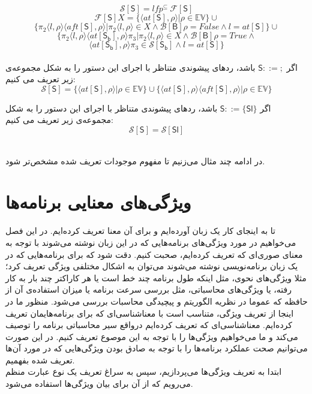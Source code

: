 \begin{defn}
$$\mathcal{S} [\mathsf{S}] = lfp^{\subseteq}\: \mathcal{F[\mathsf{S}]}      $$ $$\mathcal{F} [\mathsf{S}] X= \{ \langle at[\mathsf{S}] , \rho \rangle | \rho \in \mathbb{EV}       \} \cup $$
$$  \{ \pi_2 \langle l ,\rho \rangle \langle aft[\mathsf{S}],\rho \rangle |  \pi_2 \langle l ,\rho \rangle \in X \wedge \mathcal{B}[\mathsf{B}]\rho=False \wedge l= at[\mathsf{S}]   \} \cup      $$
$$  \{ \pi_2 \langle l ,\rho \rangle \langle at[\mathsf{S_b}],\rho \rangle \pi_3 |  \pi_2 \langle l ,\rho \rangle \in X \wedge \mathcal{B}[\mathsf{B}]\rho=True \wedge$$$$  \langle at[\mathsf{S_b}],\rho \rangle \pi_3 \in  \mathcal{S} [\mathsf{S_b}]   \wedge   l= at[\mathsf{S}]  \}  $$\\

اگر $         \mathsf{S} ::=;  $ باشد، ردهای پیشوندی متناظر با اجرای این دستور را به شکل مجموعه‌ی زیر تعریف می کنیم:
$$\mathcal{S} [\mathsf{S}] = \{ \langle at[\mathsf{S}] , \rho \rangle | \rho \in \mathbb{EV}       \} \cup     \{ \langle at[\mathsf{S}] , \rho \rangle \langle aft[\mathsf{S}] , \rho \rangle | \rho \in \mathbb{EV}       \}             $$  


اگر $         \mathsf{S} ::=\{\mathsf{Sl}\}  $ باشد، ردهای پیشوندی متناظر با اجرای این دستور را به شکل مجموعه‌ی زیر تعریف می کنیم:
$$\mathcal{S} [\mathsf{S}] = \mathcal{S} [\mathsf{Sl}] $$   \\
\end{defn}
در ادامه چند مثال می‌زنیم تا مفهوم موجودات تعریف شده مشخص‌تر شود.
\begin{exm}
	
\end{exm}
\begin{exm}
	
\end{exm}
\begin{exm}
	
\end{exm}

\section{ویژگی‌های معنایی برنامه‌ها}
تا به اینجای کار یک زبان آورده‌ایم و برای آن معنا تعریف کرده‌ایم. در این فصل می‌خواهیم در مورد ویژگی‌های برنامه‌هایی که در این زبان نوشته می‌شوند با توجه به معنای صوری‌ای که تعریف کرده‌ایم، صحبت کنیم. دقت شود که برای برنامه‌هایی که در یک زبان برنامه‌نویسی نوشته می‌شوند می‌توان به اشکال مختلفی ویژگی تعریف کرد؛ مثلا ویژگی‌های نحوی، مثل اینکه طول برنامه چند خط است یا هر کاراکتر چند بار به کار رفته، یا ویژگی‌های محاسباتی، مثل بررسی‌ سرعت برنامه یا میزان استفاده‌ی آن از حافظه که عموما در نظریه الگوریتم و پیچیدگی محاسبات بررسی می‌شود. منظور ما در اینجا از تعریف ویژگی، متناسب است با معناشناسی‌ای که برای برنامه‌هایمان تعریف کرده‌ایم. معناشناسی‌ای که تعریف کرده‌ایم درواقع سیر محاسباتی برنامه را توصیف می‌کند و ما می‌خواهیم ویژگی‌ها را با توجه به این موصوع تعریف کنیم. در این صورت می‌توانیم صحت عملکرد برنامه‌ها را با توجه به صادق بودن ویژگی‌هایی که در مورد آن‌ها تعریف شده بفهمیم.\\
ابتدا به تعریف ویژگی‌ها می‌پردازیم، سپس به سراغ تعریف یک نوع عبارت منظم می‌رویم که از آن برای بیان ویژگی‌ها استفاده می‌شود.
